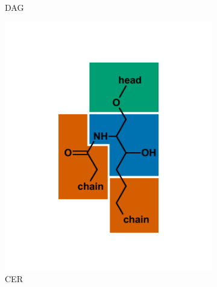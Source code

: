 \begin{figure}[h]
\begin{subfigure}[b]{.3\linewidth}
    	\caption{DAG}
        \label{fig:DAG}
    \end{subfigure}
    \begin{subfigure}[b]{.3\linewidth}
    	\includegraphics[width=\linewidth]{figs_ch1/CER}
    	\caption{CER}
        \label{fig:CER}
    \end{subfigure}
    \begin{subfigure}[b]{.3\linewidth}

\end{subfigure}
\end{figure}
